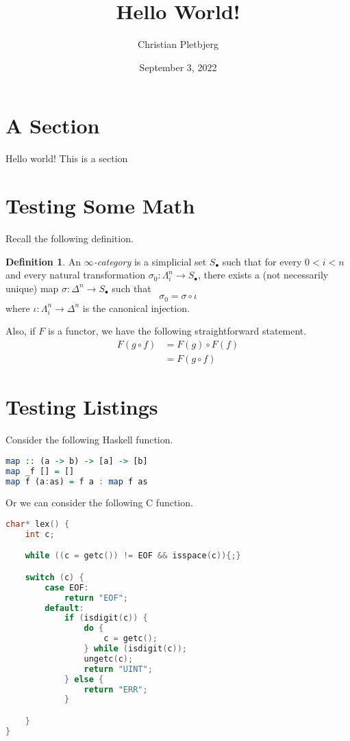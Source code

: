 \documentclass{article}
\title{Hello World!}
\author{Christian Pletbjerg}
\date{September 3, 2022}
\theoremstyle{plain}%
\theoremstyle{definition}
\newtheorem{defn}{Definition}[section]
\theoremstyle{remark}
\begin{document}
\maketitle

\tableofcontents

\section{A Section}
Hello world! This is a section

\section{Testing Some Math}
Recall the following definition.
\begin{defn}
    An \emph{$\infty$-category} is a simplicial set $S_\bullet$ such that
    for every $ 0 < i < n$ and every natural transformation $\sigma_0 : \Lambda^n_i \to S_\bullet$, there exists a (not necessarily unique) map $\sigma : \Delta^n \to S_\bullet$
    such that
    \[
        \sigma_0 = \sigma \circ \iota
    \]
    where $\iota : \Lambda^n_i \to \Delta^n$ is the canonical injection.
\end{defn}

Also, if $F$ is a functor, we have the following straightforward statement.
\[
\begin{aligned}
    F( g \circ f ) 
        &=  F( g ) \circ F (f ) \\
        &=  F( g \circ f ) 
\end{aligned}
\]

\section{Testing Listings}
Consider the following Haskell function.
\begin{lstlisting}[language=Haskell]
map :: (a -> b) -> [a] -> [b]
map _f [] = []
map f (a:as) = f a : map f as
\end{lstlisting}

Or we can consider the following C function.
\begin{lstlisting}[language=C]
char* lex() {
    int c; 

    while ((c = getc()) != EOF && isspace(c)){;}

    switch (c) {
        case EOF:
            return "EOF";
        default:
            if (isdigit(c)) {
                do {
                    c = getc();
                } while (isdigit(c));
                ungetc(c);
                return "UINT";
            } else {
                return "ERR";
            }

    }
}
\end{lstlisting}
\end{document}

